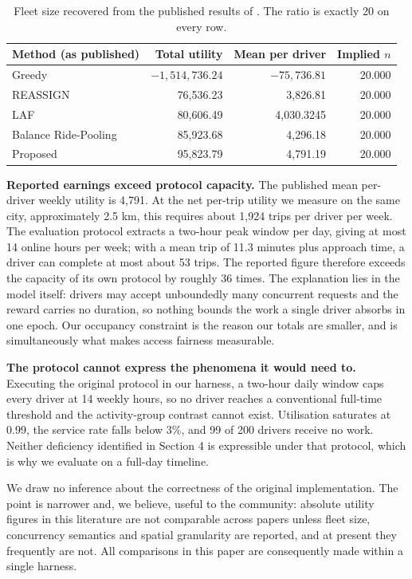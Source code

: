 \documentclass[10pt,twocolumn]{article}
\begin{document}
\begin{table}[t]
\centering
\caption{Fleet size recovered from the published results of \cite{kang2024}. The ratio is exactly 20 on every row.}
\label{tab:repro}
\small
\begin{tabular}{lrrr}
\toprule
Method (as published) & Total utility & Mean per driver & Implied \(n\) \\
\midrule
Greedy & \(-1{,}514{,}736.24\) & \(-75{,}736.81\) & 20.000 \\
REASSIGN & 76,536.23 & 3,826.81 & 20.000 \\
LAF & 80,606.49 & 4,030.3245 & 20.000 \\
Balance Ride-Pooling & 85,923.68 & 4,296.18 & 20.000 \\
Proposed & 95,823.79 & 4,791.19 & 20.000 \\
\bottomrule
\end{tabular}
\end{table}
\textbf{Reported earnings exceed protocol capacity.} The published mean per-driver weekly utility is 4{,}791. At the net per-trip utility we measure on the same city, approximately 2.5 km, this requires about 1{,}924 trips per driver per week. The evaluation protocol extracts a two-hour peak window per day, giving at most 14 online hours per week; with a mean trip of 11.3 minutes plus approach time, a driver can complete at most about 53 trips. The reported figure therefore exceeds the capacity of its own protocol by roughly 36 times. The explanation lies in the model itself: drivers may accept unboundedly many concurrent requests and the reward carries no duration, so nothing bounds the work a single driver absorbs in one epoch. Our occupancy constraint is the reason our totals are smaller, and is simultaneously what makes access fairness measurable.

\textbf{The protocol cannot express the phenomena it would need to.} Executing the original protocol in our harness, a two-hour daily window caps every driver at 14 weekly hours, so no driver reaches a conventional full-time threshold and the activity-group contrast cannot exist. Utilisation saturates at 0.99, the service rate falls below 3\%, and 99 of 200 drivers receive no work. Neither deficiency identified in Section 4 is expressible under that protocol, which is why we evaluate on a full-day timeline.

We draw no inference about the correctness of the original implementation. The point is narrower and, we believe, useful to the community: absolute utility figures in this literature are not comparable across papers unless fleet size, concurrency semantics and spatial granularity are reported, and at present they frequently are not. All comparisons in this paper are consequently made within a single harness.
\end{document}
